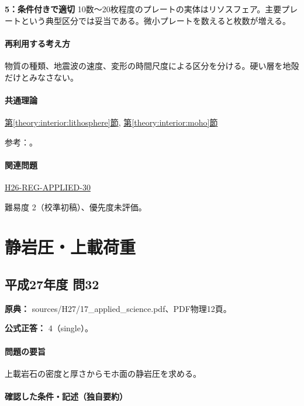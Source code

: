 \noindent\textbf{5：条件付きで適切} 10数〜20枚程度のプレートの実体はリソスフェア。主要プレートという典型区分では妥当である。微小プレートを数えると枚数が増える。\par

\paragraph{再利用する考え方} 物質の種類、地震波の速度、変形の時間尺度による区分を分ける。硬い層を地殻だけとみなさない。

\paragraph{共通理論} \hyperref[theory:interior:lithosphere]{第\ref*{theory:interior:lithosphere}節}, \hyperref[theory:interior:moho]{第\ref*{theory:interior:moho}節}

\par 参考：\cite{usgs_lithosphere2002,kagoshima_plate2019}。

\paragraph{関連問題} \hyperref[q:h26-reg-applied-30]{H26-REG-APPLIED-30}

\par 難易度 2（校準初稿）、優先度未評価。

\section{静岩圧・上載荷重}

\subsection{平成27年度 問32}
\label{q:h27-reg-applied-32}

\noindent\textbf{原典：} sources/H27/17\_applied\_science.pdf、PDF物理12頁。

\textbf{公式正答：} 4（single）。

\paragraph{問題の要旨} 上載岩石の密度と厚さからモホ面の静岩圧を求める。

\paragraph{確認した条件・記述（独自要約）}\mbox{}\par

